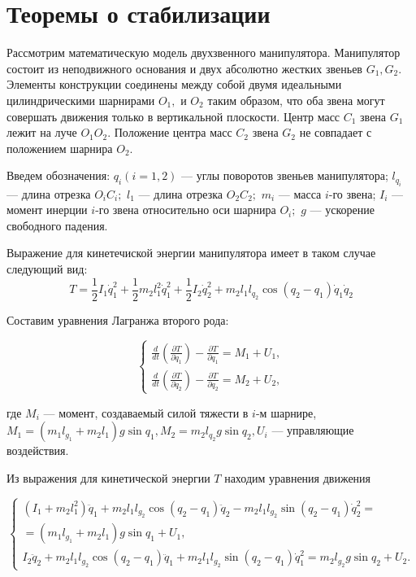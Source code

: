 \section{Теоремы о стабилизации} \label{p21}
Рассмотрим математическую модель двухзвенного манипулятора. Манипулятор состоит из неподвижного основания и двух абсолютно жестких звеньев $G_1, G_2$. Элементы конструкции соединены между собой двумя идеальными цилиндрическими шарнирами $O_1,$ и $O_2$ таким образом, что оба звена могут совершать движения только в вертикальной плоскости. Центр масс $C_1$ звена $G_1$ лежит на луче $O_1 O_2.$ Положение центра масс $C_2$ звена $G_2$ не совпадает с положением шарнира $O_2$.

Введем обозначения: $q_i (i = 1, 2)$ --- углы поворотов звеньев манипулятора; $l_{q_i}$ --- длина отрезка $O_i C_i;$ $l_1$ --- длина отрезка $O_2 C_2;$ $m_i$  ---  масса   $i$-го звена;   $I_i$ --- момент инерции  $i$-го звена относительно оси шарнира $O_i;$ $g$ --- ускорение свободного падения.

Выражение для кинетечиской энергии манипулятора имеет в таком случае следующий вид:
\begin{equation*}
T = \frac{1}{2} I_1 \dot q_1^2 + \frac12 m_2 l_1^2 \dot q_1^2 + \frac12 I_2 \dot q_2^2 + m_2 l_1 l_{q_2} \cos (q_2 - q_1) \dot q_1 \dot q_2
\end{equation*}

Составим уравнения Лагранжа второго рода:

\begin{equation*}
\begin{cases}
\frac{d}{dt} (\frac{\partial T}{\partial \dot q_1}) - \frac{\partial T}{\partial q_1} = M_1 + U_1, 
\\
\frac{d}{dt} (\frac{\partial T}{\partial \dot q_2}) - \frac{\partial T}{\partial q_2} = M_2 + U_2,
\end{cases}
\label{2.1'}
\end{equation*}

где $M_i$ --- момент, создаваемый силой тяжести в $i$-м шарнире, $M_1 = (m_1 l_{g_1} + m_2 l_1) g \sin q_1, M_2 = m_2 l_{q_2} g \sin q_2, U_i $ --- управляющие воздействия.

Из выражения для кинетической энергии $T$ находим уравнения движения

\begin{equation*}
\begin{cases}
(I_1 + m_2 l_1^2) \ddot q_1 + m_2 l_1 l_{g_2} \cos(q_2 - q_1) \ddot q_2 - m_2 l_1 l_{g_2} \sin(q_2 - q_1) \dot q_2^2 = \\ = (m_1 l_{g_1} + m_2 l_1) g \sin q_1 + U_1,
\\
I_2 \ddot q_2 + m_2 l_1 l_{g_2} \cos(q_2 - q_1) \ddot q_1 + m_2 l_1 l_{g_2} \sin(q_2 - q_1) \dot q_1^2 = m_2 l_{g_2} g \sin q_2 + U_2.
\end{cases}
\end{equation*}


